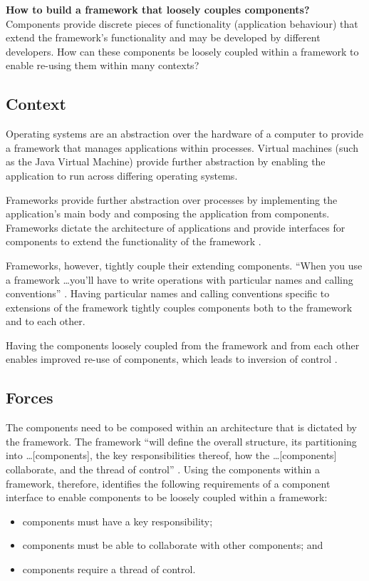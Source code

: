 \documentclass[prodmode]{style/acmlarge}
\begin{document}
\textbf{How to build a framework that loosely couples components?} Components
provide discrete pieces of functionality (application behaviour) that extend the
framework's functionality and may be developed by different developers.  How can
these components be loosely coupled within a framework to enable re-using them
within many contexts?


\subsection{Context}

Operating systems are an abstraction over the hardware of a computer to
provide a framework that manages applications within processes.  Virtual
machines (such as the Java Virtual Machine) provide further abstraction by
enabling the application to run across differing operating systems.

Frameworks provide further abstraction over processes by implementing the
application's main body and composing the application from components. 
Frameworks dictate the architecture of applications and provide interfaces for
components to extend the functionality of the framework \cite{gof}.

Frameworks, however, tightly couple their extending components.  ``When you use a
framework \ldots you'll have to write operations with particular names and
calling conventions'' \cite[p. 27]{gof}.  Having particular names and calling
conventions specific to extensions of the framework  tightly couples components
both to the framework and to each other.

Having the components loosely coupled from the framework and from each other
enables improved re-use of components, which leads to inversion of control \cite{gof}.


\subsection{Forces}

The components need to be composed within an architecture that is dictated by
the framework.  The framework ``will define the overall structure, its
partitioning into \ldots [components], the key responsibilities thereof, how the
\ldots [components] collaborate, and the thread of control'' \cite[p.26]{gof}.
Using the components within a framework, therefore, identifies the following
requirements of a component interface to enable components to be loosely coupled
within a framework:
\begin{itemize}
  \item components must have a key responsibility;
  \item components must be able to collaborate with other components; and
  \item components require a thread of control.
\end{itemize}
\end{document}
